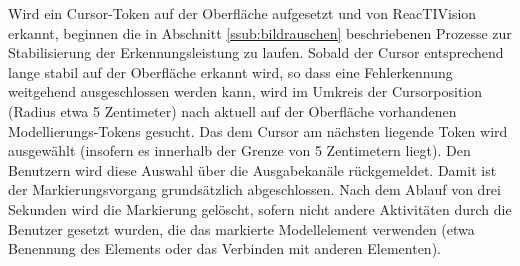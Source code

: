 Wird ein Cursor-Token auf der Oberfläche aufgesetzt und von ReacTIVision erkannt, beginnen die in Abschnitt \ref{ssub:bildrauschen} beschriebenen Prozesse zur Stabilisierung der Erkennungsleistung zu laufen. Sobald der Cursor entsprechend lange stabil auf der Oberfläche erkannt wird, so dass eine Fehlerkennung weitgehend ausgeschlossen werden kann, wird im Umkreis der Cursorposition (Radius etwa 5 Zentimeter) nach aktuell auf der Oberfläche vorhandenen Modellierungs-Tokens gesucht. Das dem Cursor am nächsten liegende Token wird ausgewählt (insofern es innerhalb der Grenze von 5 Zentimetern liegt). Den Benutzern wird diese Auswahl über die Ausgabekanäle rückgemeldet. Damit ist der Markierungsvorgang grundsätzlich abgeschlossen. Nach dem Ablauf von drei Sekunden wird die Markierung gelöscht, sofern nicht andere Aktivitäten durch die Benutzer gesetzt wurden, die das markierte Modellelement verwenden (etwa Benennung des Elements oder das Verbinden mit anderen Elementen). 

